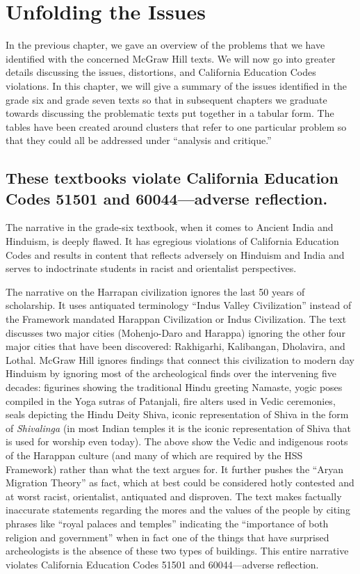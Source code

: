 \chapter{Unfolding the Issues}

In the previous chapter, we gave an overview of the problems that we have identified with the concerned McGraw Hill texts. We will now go into greater details discussing the issues, distortions, and California Education Codes violations. In this chapter, we will give a summary of the issues identified in the grade six and grade seven texts so that in subsequent chapters we graduate towards discussing the problematic texts put together in a tabular form. The tables have been created around clusters that refer to one particular problem so that they could all be addressed under “analysis and critique.”  
\vskip -10pt

\section*{These textbooks violate California Education Codes 51501 and 60044—adverse reflection.} 
\vskip -6pt

The narrative in the grade-six textbook, when it comes to Ancient India and Hinduism, is deeply flawed. It has egregious violations of California Education Codes and results in content that reflects adversely on Hinduism and India and serves to indoctrinate students in racist and orientalist perspectives.

The narrative on the Harrapan civilization ignores the last 50 years of scholarship. It uses antiquated terminology “Indus Valley Civilization” instead of the Framework mandated Harappan Civilization or Indus Civilization. The text discusses two major cities (Mohenjo-Daro and Harappa) ignoring the other four major cities that have been discovered: Rakhigarhi, Kalibangan, Dholavira, and Lothal. McGraw Hill ignores findings that connect this civilization to modern day Hinduism by ignoring most of the archeological finds over the intervening five decades: figurines showing the traditional Hindu greeting Namaste, yogic poses compiled in the Yoga sutras of Patanjali, fire alters used in Vedic ceremonies, seals depicting the Hindu Deity Shiva, iconic representation of Shiva in the form of \textit{Shivalinga}  (in most Indian temples it is the iconic representation of Shiva that is used for worship even today). The above show the Vedic and indigenous roots of the Harappan culture (and many of which are required by the HSS Framework) rather than what the text argues for. It further pushes the “Aryan Migration Theory” as fact, which at best could be considered hotly contested and at worst racist, orientalist, antiquated and disproven. The text makes factually inaccurate statements regarding the mores and the values of the people by citing phrases like “royal palaces and temples” indicating the “importance of both religion and government” when in fact one of the things that have surprised archeologists is the absence of these two types of buildings. This entire narrative violates California Education Codes 51501 and 60044—adverse reflection.  

